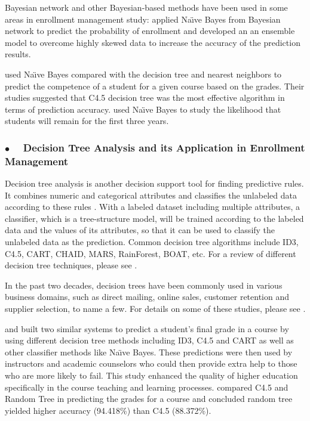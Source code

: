 \documentclass[12pt,english]{report}
\begin{document}

Bayesian network and other Bayesian-based methods have been used in some areas
in enrollment management study:
\citet{optimization_bayesian} applied Na{\"\i}ve Bayes from Bayesian network to
predict the probability of enrollment and developed an  an ensemble model to
overcome highly skewed data to increase the accuracy of the prediction results.

\citet{dt_enroll_academic} used Na{\"\i}ve Bayes compared with the decision
tree
and nearest neighbors to predict the competence of a student for a given course
based on the grades. Their studies suggested that C4.5 decision tree was the
most effective algorithm in terms of prediction accuracy.
\citet{nandeshwarlearning2011} used Na{\"\i}ve Bayes to study the likelihood
that students will remain for the first three years.

\subsubsection{$\bullet \quad$  Decision Tree Analysis and its Application in
Enrollment Management}
Decision tree analysis is another decision support tool for finding predictive
rules. It combines numeric and categorical attributes and classifies the
unlabeled data according to these rules \citep{Han2011}. With a labeled dataset
including multiple attributes, a classifier, which is a tree-structure model,
will be trained according to the labeled data and the values of its attributes,
so that it can be used to classify the unlabeled data as the prediction. Common
decision tree algorithms include ID3, C4.5, CART, CHAID, MARS, RainForest,
BOAT, etc.  For a review of different decision tree techniques, please see
\citep{Loh2011}.

In the past two decades, decision trees have been commonly used in various
business domains, such as direct mailing, online sales, customer retention and
supplier selection, to name a few.  For details on some of these studies,
please see \citep{Berry2004}.

\citet{dt_performance} and \citet{dt_performance1} built two similar systems to
predict a student's final grade in a course by using different decision tree
methods including ID3, C4.5 and CART as well as other classifier methods like
Na{\"\i}ve Bayes. These predictions were then used by instructors and academic
counselors who could then provide extra help to those who are more likely to
fail. This study enhanced the quality of higher education specifically in the
course teaching and learning processes. \citet{dt_performance2} compared C4.5
and Random Tree in predicting the grades for a course and concluded random tree
yielded higher accuracy (94.418\%) than C4.5 (88.372\%).
\end{document}
